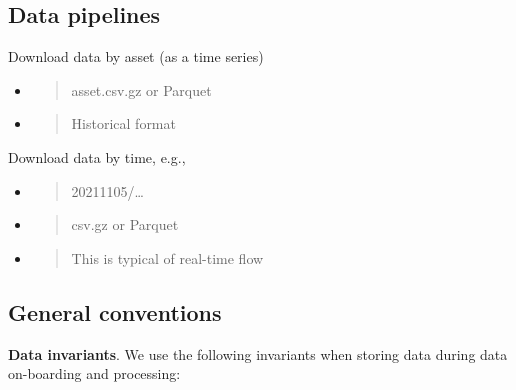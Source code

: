 \documentclass[11pt, reqno]{amsart}
\begin{document}
\subsection{Data pipelines}

Download data by asset (as a time series)

\begin{itemize}
\item
  \begin{quote}
  asset.csv.gz or Parquet
  \end{quote}
\item
  \begin{quote}
  Historical format
  \end{quote}
\end{itemize}

Download data by time, e.g.,

\begin{itemize}
\item
  \begin{quote}
  20211105/\ldots{}
  \end{quote}
\item
  \begin{quote}
  csv.gz or Parquet
  \end{quote}
\item
  \begin{quote}
  This is typical of real-time flow
  \end{quote}
\end{itemize}

\subsection{General conventions}

\textbf{Data invariants}. We use the following invariants when storing
data during data on-boarding and processing:
\end{document}
